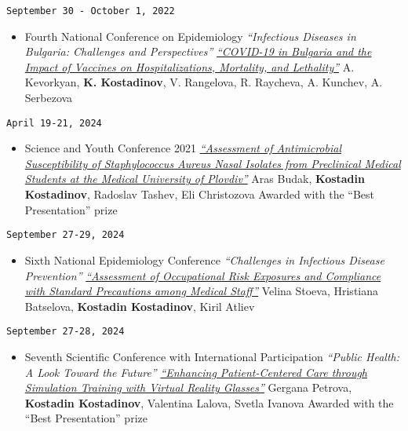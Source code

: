 \documentclass[
  12pt,
  letterpaper,
  DIV=11,
  numbers=noendperiod]{scrartcl}
\providecommand{\tightlist}{%
  \setlength{\itemsep}{0pt}\setlength{\parskip}{0pt}}\usepackage{longtable,booktabs,array}
\begin{document}
\texttt{September\ 30\ -\ October\ 1,\ 2022}

\begin{itemize}
\tightlist
\item
  Fourth National Conference on Epidemiology \textbar{}
  \emph{``Infectious Diseases in Bulgaria: Challenges and
  Perspectives''} \textbar{}
  \emph{\href{http://bulepid.org/_upload2018/PROGRAMA\%202022-pre-final\%20-\%20Copy.pdf}{``COVID-19
  in Bulgaria and the Impact of Vaccines on Hospitalizations, Mortality,
  and Lethality''}} \textbar{} A. Kevorkyan, \textbf{K. Kostadinov}, V.
  Rangelova, R. Raycheva, A. Kunchev, A. Serbezova
\end{itemize}

\texttt{April\ 19-21,\ 2024}

\begin{itemize}
\tightlist
\item
  Science and Youth Conference 2021 \textbar{}
  \emph{\href{https://asclepius.bg/cnm/wp-content/uploads/2024/04/SY-DMS-2024-abstracts-web.pdf}{``Assessment
  of Antimicrobial Susceptibility of Staphylococcus Aureus Nasal
  Isolates from Preclinical Medical Students at the Medical University
  of Plovdiv''}} \textbar{} Aras Budak, \textbf{Kostadin Kostadinov},
  Radoslav Tashev, Eli Christozova \textbar{} Awarded with the ``Best
  Presentation'' prize
\end{itemize}

\texttt{September\ 27-29,\ 2024}

\begin{itemize}
\tightlist
\item
  Sixth National Epidemiology Conference \textbar{} \emph{``Challenges
  in Infectious Disease Prevention''} \textbar{}
  \emph{\href{http://bulepid.org/_upload2018/PROGRAMA\%202024-final.pdf}{``Assessment
  of Occupational Risk Exposures and Compliance with Standard
  Precautions among Medical Staff''}} \textbar{} Velina Stoeva,
  Hristiana Batselova, \textbf{Kostadin Kostadinov}, Kiril Atliev
\end{itemize}

\texttt{September\ 27-28,\ 2024}

\begin{itemize}
\tightlist
\item
  Seventh Scientific Conference with International Participation
  \textbar{} \emph{``Public Health: A Look Toward the Future''}
  \textbar{}
  \emph{\href{https://publisher.mu-plovdiv.bg/wp-content/uploads/published-online/public-health-conf/2024/abstract-book.html\#p=56}{``Enhancing
  Patient-Centered Care through Simulation Training with Virtual Reality
  Glasses''}} \textbar{} Gergana Petrova, \textbf{Kostadin Kostadinov},
  Valentina Lalova, Svetla Ivanova \textbar{} Awarded with the ``Best
  Presentation'' prize
\end{itemize}
\end{document}
